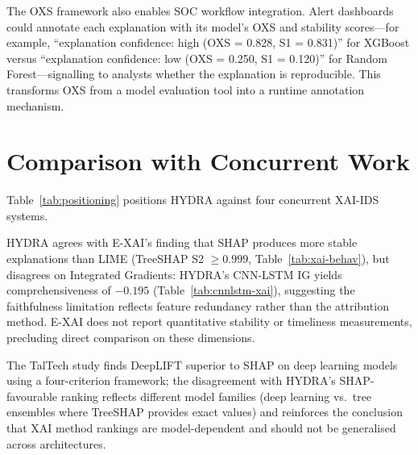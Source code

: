 \documentclass[12pt,a4paper]{report}
\begin{document}
\begin{center}
\end{center}

The OXS framework also enables SOC workflow integration. Alert dashboards could annotate each explanation with its model's OXS and stability scores---for example, ``explanation confidence: high (OXS = 0.828, S1 = 0.831)'' for XGBoost versus ``explanation confidence: low (OXS = 0.250, S1 = 0.120)'' for Random Forest---signalling to analysts whether the explanation is reproducible. This transforms OXS from a model evaluation tool into a runtime annotation mechanism.

\section{Comparison with Concurrent Work}
\label{sec:concurrent-comparison}

Table~\ref{tab:positioning} positions HYDRA against four concurrent XAI-IDS systems.

HYDRA agrees with E-XAI's \cite{arreche2024} finding that SHAP produces more stable explanations than LIME (TreeSHAP S2 $\geq 0.999$, Table~\ref{tab:xai-behav}), but disagrees on Integrated Gradients: HYDRA's CNN-LSTM IG yields comprehensiveness of $-0.195$ (Table~\ref{tab:cnnlstm-xai}), suggesting the faithfulness limitation reflects feature redundancy rather than the attribution method. E-XAI does not report quantitative stability or timeliness measurements, precluding direct comparison on these dimensions.

The TalTech study \cite{kalakoti2025} finds DeepLIFT superior to SHAP on deep learning models using a four-criterion framework; the disagreement with HYDRA's SHAP-favourable ranking reflects different model families (deep learning vs.\ tree ensembles where TreeSHAP provides exact values) and reinforces the conclusion that XAI method rankings are model-dependent and should not be generalised across architectures.
\end{document}
